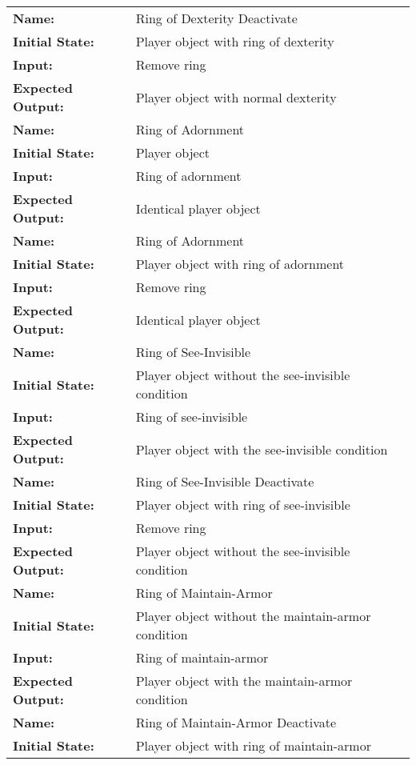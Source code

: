 \documentclass[12pt, titlepage]{article}
\begin{document}
\begin{center}
\begin{longtable}{ l | p{10cm} }
				\hline
				\textbf{Name:} & Ring of Dexterity Deactivate\\
				\textbf{Initial State:} & Player object with ring of dexterity\\
				\textbf{Input:} & Remove ring\\
				\textbf{Expected Output:} & Player object with normal dexterity\\
				\hline
				\textbf{Name:} & Ring of Adornment\\
				\textbf{Initial State:} & Player object\\
				\textbf{Input:} & Ring of adornment\\
				\textbf{Expected Output:} & Identical player object\\
				\hline
				\textbf{Name:} & Ring of Adornment\\
				\textbf{Initial State:} & Player object with ring of adornment\\
				\textbf{Input:} & Remove ring\\
				\textbf{Expected Output:} & Identical player object\\
				\hline
				\textbf{Name:} & Ring of See-Invisible\\
				\textbf{Initial State:} & Player object without the see-invisible condition\\
				\textbf{Input:} & Ring of see-invisible\\
				\textbf{Expected Output:} & Player object with the see-invisible condition\\
				\hline
				\textbf{Name:} & Ring of See-Invisible Deactivate\\
				\textbf{Initial State:} & Player object with ring of see-invisible\\
				\textbf{Input:} & Remove ring\\
				\textbf{Expected Output:} & Player object without the see-invisible condition\\
				\hline
				\textbf{Name:} & Ring of Maintain-Armor\\
				\textbf{Initial State:} & Player object without the maintain-armor condition\\
				\textbf{Input:} & Ring of maintain-armor\\
				\textbf{Expected Output:} & Player object with the maintain-armor condition\\
				\hline
				\textbf{Name:} & Ring of Maintain-Armor Deactivate\\
				\textbf{Initial State:} & Player object with ring of maintain-armor\\

\end{longtable}
\end{center}
\end{document}
